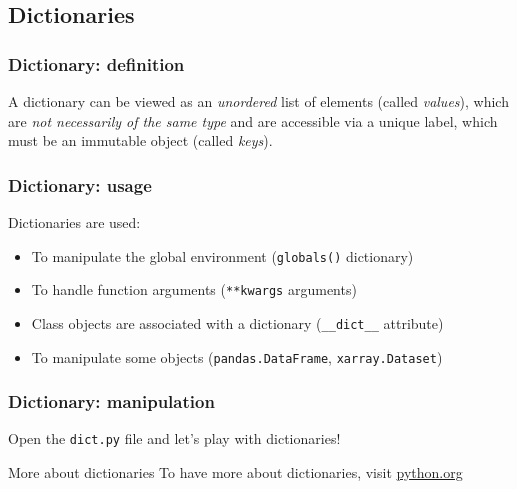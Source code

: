 \subsection{Dictionaries}

\begin{frame}[fragile]
    \frametitle{Dictionary: definition}
    A dictionary can be viewed as an \emph{unordered} list of elements (called \emph{values}),  which are \emph{not necessarily of the same type} and are accessible via a unique label, which must be an immutable object (called \emph{keys}).\\
    \vspace{1em}
    

\end{frame}

\begin{frame}[fragile]
    \frametitle{Dictionary: usage}
    Dictionaries are used:
    \begin{itemize}
        \item{To manipulate the global environment (\verb+globals()+ dictionary)}
        \item{To handle function arguments (\verb+**kwargs+ arguments)}
        \item{Class objects are associated with a dictionary (\verb+__dict__+ attribute)}
        \item{To manipulate some objects (\verb+pandas.DataFrame+, \verb+xarray.Dataset+)}
    \end{itemize}

\end{frame}

\begin{frame}[fragile]
    \frametitle{Dictionary: manipulation}
        Open the \verb+dict.py+ file and let's play with dictionaries!

    \begin{block}{More about dictionaries}
        To have more about dictionaries, visit \href{https://docs.python.org/3/tutorial/datastructures.html#dictionaries}{python.org}
    \end{block}

\end{frame}
